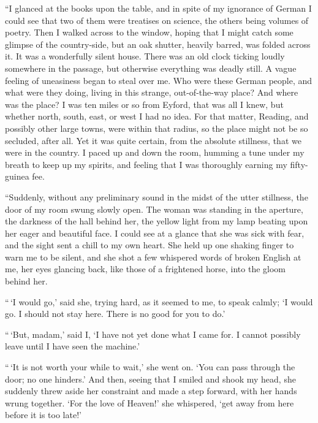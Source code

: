“I glanced at the books upon the table, and in spite of my
ignorance of German I could see that two of them were treatises
on science, the others being volumes of poetry. Then I
walked across to the window, hoping that I might catch some
glimpse of the country-side, but an oak shutter, heavily barred,
was folded across it. It was a wonderfully silent house.
There was an old clock ticking loudly somewhere in the passage,
but otherwise everything was deadly still. A vague
feeling of uneasiness began to steal over me. Who were
these German people, and what were they doing, living in this
strange, out-of-the-way place? And where was the place? I
was ten miles or so from Eyford, that was all I knew, but
whether north, south, east, or west I had no idea. For that
matter, Reading, and possibly other large towns, were within
that radius, so the place might not be so secluded, after all.
Yet it was quite certain, from the absolute stillness, that we
were in the country. I paced up and down the room, humming
a tune under my breath to keep up my spirits, and feeling
that I was thoroughly earning my fifty-guinea fee.

“Suddenly, without any preliminary sound in the midst of
the utter stillness, the door of my room swung slowly open.
The woman was standing in the aperture, the darkness of the
hall behind her, the yellow light from my lamp beating upon
her eager and beautiful face. I could see at a glance that she
was sick with fear, and the sight sent a chill to my own heart.
She held up one shaking finger to warn me to be silent, and
she shot a few whispered words of broken English at me, her
eyes glancing back, like those of a frightened horse, into the
gloom behind her.

“\,‘I would go,’ said she, trying hard, as it seemed to me, to
speak calmly; ‘I would go. I should not stay here. There
is no good for you to do.’

“\,‘But, madam,’ said I, ‘I have not yet done what I came
for. I cannot possibly leave until I have seen the machine.’

“\,‘It is not worth your while to wait,’ she went on. ‘You
can pass through the door; no one hinders.’ And then, seeing
that I smiled and shook my head, she suddenly threw
aside her constraint and made a step forward, with her hands
wrung together. ‘For the love of Heaven!’ she whispered,
‘get away from here before it is too late!’

